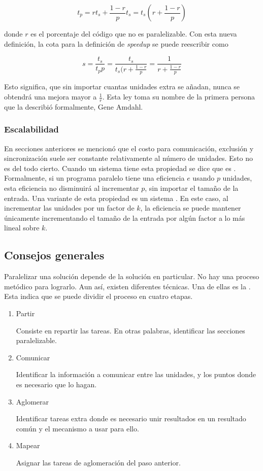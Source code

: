 \begin{equation}
  \label{eq:amdahl}
  t_{p} = rt_{s} + \frac{1-r}{p} t_{s} = t_{s}(r + \frac{1-r}{p})
\end{equation}

donde $r$ es el porcentaje del código que no es paralelizable. Con esta nueva
definición, la cota para la definición de \emph{speedup} se puede reescribir
como

\[
s = \frac{t_{s}}{t_{p}p} = \frac{t_{s}}{t_{s}(r + \frac{1-r}{p}}
= \frac{1}{r + \frac{1-r}{p}}
\]

Esto significa, que sin importar cuantas unidades extra se añadan, nunca se
obtendrá una mejora mayor a $\frac{1}{r}$. Esta ley toma su nombre de la
primera persona que la describió formalmente, Gene Amdahl.

\subsubsection{Escalabilidad}

En secciones anteriores se mencionó que el costo para comunicación, exclusión
y sincronización suele ser constante relativamente al número de unidades. Esto
no es del todo cierto. Cuando un sistema tiene esta propiedad se dice que es
. Formalmente, si un programa paralelo tiene una
eficiencia $e$ usando $p$ unidades, esta eficiencia no disminuirá
al incrementar $p$, sin importar el tamaño de la entrada. Una variante de esta
propiedad es un sistema . En este caso, al
incrementar las unidades por un factor de $k$, la eficiencia se puede mantener
únicamente incrementando el tamaño de la entrada por algún factor a lo más
lineal sobre $k$.

\subsection{Consejos generales}

Paralelizar una solución depende de la solución en particular. No hay una
proceso metódico para lograrlo. Aun así, existen diferentes técnicas. Una de
ellas es la . Esta indica que se puede dividir el
proceso en cuatro etapas.

\begin{enumerate}
\item Partir

  Consiste en repartir las tareas. En otras palabras, identificar las secciones
  paralelizable.

\item Comunicar

  Identificar la información a comunicar entre las unidades, y los puntos donde
  es necesario que lo hagan.

\item Aglomerar

  Identificar tareas extra donde es necesario unir resultados en un resultado
  común y el mecanismo a usar para ello.

\item Mapear

  Asignar las tareas de aglomeración del paso anterior.
\end{enumerate}

